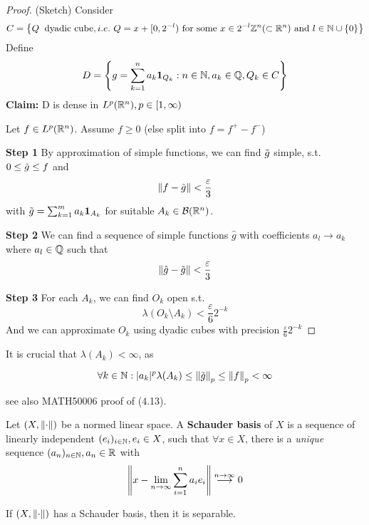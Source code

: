 \documentclass{article}
\begin{document}
\begin{proof}
    (Sketch)  Consider  
    $$
    C = \left\{Q\: \text{\ dyadic\ cube}, i.e. \ Q = x + [0, 2^{-l}) \text{\ for\ some\ } x \in 2^{-l} \inte^n(\subset \real^n) \text{\ and\ } l\in \natu \cup \{0\}\right\}
    $$   
    Define  
    $$
    D = \left\{g = \sum_{k=1}^n a_k \mathbf{1}_{Q_k}: n\in \mathbb{N}, a_k \in \mathbb{Q}, Q_k \in C \right\}
    $$
    \textbf{Claim:} D is dense in $L^p(\mathbb{R}^n), p \in [1, \infty)$  

    Let $f \in L^p(\mathbb{R}^n)$. Assume $f \geq 0$ (else split into $f=f^+-f^-$)  

    \textbf{Step 1} By approximation of simple functions, we can find $\Tilde{g}$ simple, s.t. $0 \leq \Tilde{g} \leq f$ and  
    $$
    \left\|{f-\Tilde{g}}\right\| < \frac{\varepsilon}{3}
    $$  
    with $\Tilde{g}=\sum_{k=1}^m a_k \mathbf{1}_{A_k}$ for suitable $A_k \in \mathcal{B}(\mathbb{R}^n)$.  

    \textbf{Step 2} We can find a sequence of simple functions $\hat{g}$ with coefficients $a_l \to a_k$ where $a_l\in \mathbb{Q}$ such that  
    $$
    \left\|{\hat{g}-\Tilde{g}}\right\| < \frac{\varepsilon}{3}
    $$  

    \textbf{Step 3} For each $A_k$, we can find $O_k$ open s.t.  
    $$
    \lambda(O_k\setminus A_k) < \frac{\varepsilon}{6} 2^{-k}
    $$
    And we can approximate $O_k$ using dyadic cubes with precision $\frac{\varepsilon}{6} 2^{-k}$
\end{proof}  

It is crucial that $\lambda(A_k) < \infty$, as  

$$
\forall k \in \mathbb{N}: |a_k|^p \lambda(A_k) \leq \left\|{\Tilde{g}}\right\|_p \leq \left\|{f}\right\|_p < \infty
$$  

see also MATH50006 proof of (4.13). 

\begin{definition}

Let $(X,\left\|{\cdot}\right\|)$ be a normed linear space. A \textbf{Schauder basis} of $X$ is a sequence of linearly independent $(e_i)_{i\in \mathbb{N}}, e_i \in X$, such that $\forall x \in X$,  there is a \textit{unique} sequence $(a_n)_{n\in \mathbb{N}}, a_n \in \mathbb{R}$ with
$$
\left\|{x - \lim_{n\to\infty}\sum_{i=1}^n a_i e_i}\right\| \overset{n\to \infty}{\longrightarrow} 0
$$
\end{definition}


\begin{proposition}
\label{Schauder implies separability}
	If $(X, \left\|{\cdot}\right\|)$ has a Schauder basis, then it is separable.
\end{proposition}  
\end{document}
